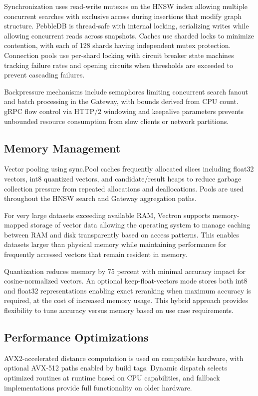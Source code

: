 \documentclass[conference]{IEEEtran}
\begin{document}
Synchronization uses read-write mutexes on the HNSW index allowing multiple concurrent searches with exclusive access during insertions that modify graph structure. PebbleDB is thread-safe with internal locking, serializing writes while allowing concurrent reads across snapshots. Caches use sharded locks to minimize contention, with each of 128 shards having independent mutex protection. Connection pools use per-shard locking with circuit breaker state machines tracking failure rates and opening circuits when thresholds are exceeded to prevent cascading failures.

Backpressure mechanisms include semaphores limiting concurrent search fanout and batch processing in the Gateway, with bounds derived from CPU count. gRPC flow control via HTTP/2 windowing and keepalive parameters prevents unbounded resource consumption from slow clients or network partitions.

\subsection{Memory Management}

Vector pooling using sync.Pool caches frequently allocated slices including float32 vectors, int8 quantized vectors, and candidate/result heaps to reduce garbage collection pressure from repeated allocations and deallocations. Pools are used throughout the HNSW search and Gateway aggregation paths.

For very large datasets exceeding available RAM, Vectron supports memory-mapped storage of vector data allowing the operating system to manage caching between RAM and disk transparently based on access patterns. This enables datasets larger than physical memory while maintaining performance for frequently accessed vectors that remain resident in memory.

Quantization reduces memory by 75 percent with minimal accuracy impact for cosine-normalized vectors. An optional keep-float-vectors mode stores both int8 and float32 representations enabling exact reranking when maximum accuracy is required, at the cost of increased memory usage. This hybrid approach provides flexibility to tune accuracy versus memory based on use case requirements.

\subsection{Performance Optimizations}

AVX2-accelerated distance computation \cite{simd} is used on compatible hardware, with optional AVX-512 paths enabled by build tags. Dynamic dispatch selects optimized routines at runtime based on CPU capabilities, and fallback implementations provide full functionality on older hardware.
\end{document}

